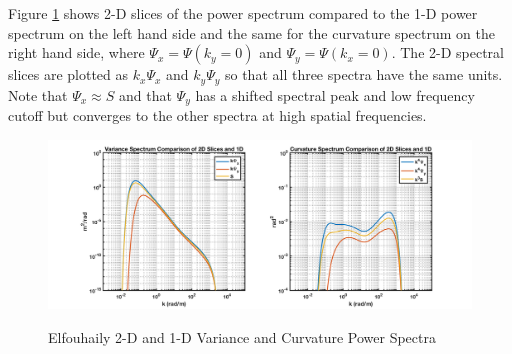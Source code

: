 Figure \ref{os_fig:7bc} shows 2-D slices of the power spectrum compared to the 1-D power spectrum on the left hand side and the same for the curvature spectrum on the right hand side, where $\Psi_x = \Psi(k_y = 0)$ and $\Psi_y = \Psi(k_x = 0)$. The 2-D spectral slices are plotted as $k_x\Psi_x$ and $k_y\Psi_y$ so that all three spectra have the same units. Note that $\Psi_x \approx S$ and that $\Psi_y$ has a shifted spectral peak and low frequency cutoff but converges to the other spectra at high spatial frequencies.

\begin{figure}[H]
  \begin{center}
\includegraphics[width=6in]{../media/Ocean_Surface/elf_variance_curvature_spectrum_2D_slices.png}
  \end{center}
  \renewcommand{\baselinestretch}{1} \small\normalsize
  \begin{quote}
    \caption[Elfouhaily 2-D and 1D Variance and Curvature Power Spectra]{Elfouhaily 2-D and 1-D Variance and Curvature Power Spectra\label{os_fig:7bc}}
  \end{quote}
\end{figure}
\renewcommand{\baselinestretch}{2} \small\normalsize

